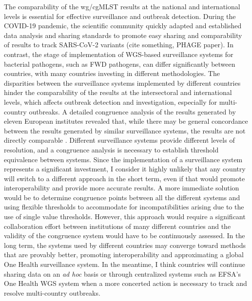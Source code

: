 The comparability of the wg/cgMLST results at the national and international levels is essential for effective surveillance and outbreak detection. During the COVID-19 pandemic, the scientific community quickly adapted and established data analysis and sharing standards to promote easy sharing and comparability of results to track SARS-CoV-2 variants (cite something, PHAGE paper). In contrast, the stage of implementation of WGS-based surveillance systems for bacterial pathogens, such as \ac{FWD} pathogens, can differ significantly between countries, with many countries investing in different methodologies. The disparities between the surveillance systems implemented by different countries hinder the comparability of the results at the intersectoral and international levels, which affects outbreak detection and investigation, especially for multi-country outbreaks. A detailed congruence analysis of the results generated by eleven European institutes revealed that, while there may be general concordance between the results generated by similar surveillance systems, the results are not directly comparable \cite{mixao_multi-country_2025}. Different surveillance systems provide different levels of resolution, and a congruence analysis is necessary to establish threshold equivalence between systems. Since the implementation of a surveillance system represents a significant investment, I consider it highly unlikely that any country will switch to a different approach in the short term, even if that would promote interoperability and provide more accurate results. A more immediate solution would be to determine congruence points between all the different systems and using flexible thresholds to accommodate for incompatibilities arising due to the use of single value thresholds. However, this approach would require a significant collaboration effort between institutions of many different countries and the validity of the congruence system would have to be continuously assessed. In the long term, the systems used by different countries may converge toward methods that are provably better, promoting interoperability and approximating a global One Health surveillance system. In the meantime, I think countries will continue sharing data on an \textit{ad hoc} basis or through centralized systems such as \ac{EFSA}'s One Health WGS system when a more concerted action is necessary to track and resolve multi-country outbreaks.

